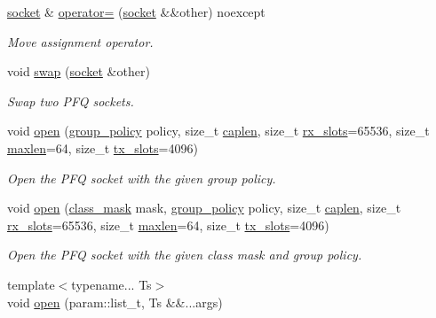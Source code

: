 \begin{DoxyCompactItemize}
\hyperlink{classpfq_1_1socket}{socket} \& \hyperlink{classpfq_1_1socket_a8022eafa68b84a840292ebcfc4d1ba7a}{operator=} (\hyperlink{classpfq_1_1socket}{socket} \&\&other) noexcept
\begin{DoxyCompactList}\small\item\em Move assignment operator. \end{DoxyCompactList}\item 
void \hyperlink{classpfq_1_1socket_ac80ebddf3a94f7964c74bf02954704ce}{swap} (\hyperlink{classpfq_1_1socket}{socket} \&other)
\begin{DoxyCompactList}\small\item\em Swap two P\+F\+Q sockets. \end{DoxyCompactList}\item 
void \hyperlink{classpfq_1_1socket_a4e9f7b3dfcf771163995fc10ed8835f8}{open} (\hyperlink{namespacepfq_ac41249c8510558905b01fa4d866a38d7}{group\+\_\+policy} policy, size\+\_\+t \hyperlink{classpfq_1_1socket_ab68dbba5ef01041b9c96758c4a9f0a6c}{caplen}, size\+\_\+t \hyperlink{classpfq_1_1socket_a5cf700fc12d67b91df3d669ac4aa737a}{rx\+\_\+slots}=65536, size\+\_\+t \hyperlink{classpfq_1_1socket_a863da5015c00d6a49f1515b703c24230}{maxlen}=64, size\+\_\+t \hyperlink{classpfq_1_1socket_a019d15a072c043d6a1333ca0c836da4c}{tx\+\_\+slots}=4096)
\begin{DoxyCompactList}\small\item\em Open the P\+F\+Q socket with the given group policy. \end{DoxyCompactList}\item 
void \hyperlink{classpfq_1_1socket_a4c622a6debdcae9cfae0abb30c47678c}{open} (\hyperlink{namespacepfq_a96af1f5ed530eff563eb917516758fbb}{class\+\_\+mask} mask, \hyperlink{namespacepfq_ac41249c8510558905b01fa4d866a38d7}{group\+\_\+policy} policy, size\+\_\+t \hyperlink{classpfq_1_1socket_ab68dbba5ef01041b9c96758c4a9f0a6c}{caplen}, size\+\_\+t \hyperlink{classpfq_1_1socket_a5cf700fc12d67b91df3d669ac4aa737a}{rx\+\_\+slots}=65536, size\+\_\+t \hyperlink{classpfq_1_1socket_a863da5015c00d6a49f1515b703c24230}{maxlen}=64, size\+\_\+t \hyperlink{classpfq_1_1socket_a019d15a072c043d6a1333ca0c836da4c}{tx\+\_\+slots}=4096)
\begin{DoxyCompactList}\small\item\em Open the P\+F\+Q socket with the given class mask and group policy. \end{DoxyCompactList}\item 
{\footnotesize template$<$typename... Ts$>$ }\\void \hyperlink{classpfq_1_1socket_a33c3e305c62f5a9f8a0ef74f69097ecf}{open} (param\+::list\+\_\+t, Ts \&\&...args)

\end{DoxyCompactItemize}
